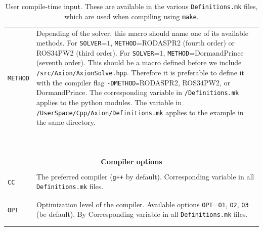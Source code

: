 \documentclass[11pt,a4paper]{article}
\begin{document}
\begin{table}[h!]
\begin{tabular}{l l}
		{\tt METHOD}& \multirow{1}{12cm}{Depending of the solver, this macro should name one of its available methods. 
		For {\tt SOLVER}=$1$, {\tt METHOD}=RODASPR2 (fourth order) or ROS34PW2 (third order). 	
		For {\tt SOLVER}=$1$, {\tt METHOD}=DormandPrince (seventh order). This should be a macro defined before we include {\tt \mimes/src/Axion/AxionSolve.hpp}. Therefore it is preferable to 
		define it with the compiler flag {\tt -DMETHOD=}RODASPR2, ROS34PW2, or DormandPrince.
		The corresponding variable in {\tt \mimes/Definitions.mk} applies to the python modules. The variable in {\tt \mimes/UserSpace/Cpp/Axion/Definitions.mk} applies to the example in the same directory.}\\\\\\\\\\\\\\\\\\\\ 		
		\hline\\[-0.4cm]
		
		\multicolumn{2}{c}{\bf Compiler options}  \\
		\hline\\[-0.4cm]
		
		{\tt CC} &  \multirow{1}{12cm}{The preferred \CPP compiler ({\tt g++} by default). Corresponding variable in all {\tt Definitions.mk} files.} \\\\
		\hline\\[-0.4cm]
		
		{\tt OPT} &  \multirow{1}{12cm}{Optimization level of the compiler. Available options {\tt OPT}={\tt O1}, {\tt O2}, {\tt O3} (be default). By Corresponding variable in all {\tt Definitions.mk} files.}   \\\\
		\hline\\[-0.4cm]

	\end{tabular}
	\caption{User compile-time input. These are available in the various {\tt Definitions.mk} files, which are used when compiling using {\tt make}.}
	\label{tab:compile_time-input}
\end{table}



\newpage
{}
                        
\end{document}
